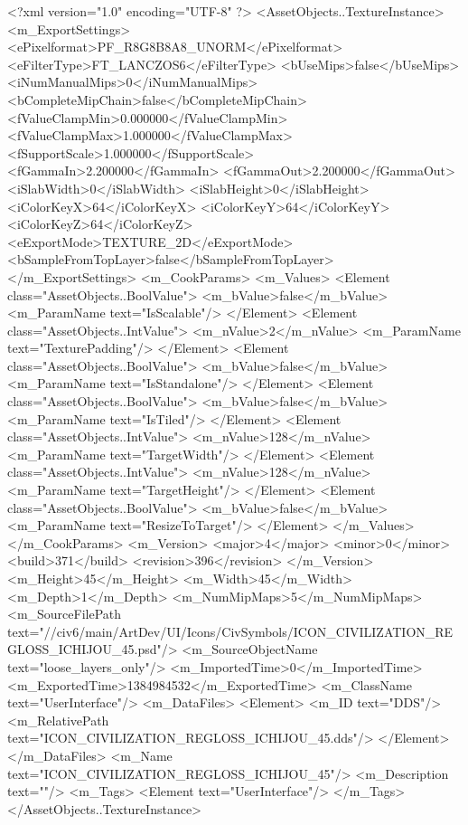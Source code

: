 <?xml version="1.0" encoding="UTF-8" ?>
<AssetObjects..TextureInstance>
	<m_ExportSettings>
		<ePixelformat>PF_R8G8B8A8_UNORM</ePixelformat>
		<eFilterType>FT_LANCZOS6</eFilterType>
		<bUseMips>false</bUseMips>
		<iNumManualMips>0</iNumManualMips>
		<bCompleteMipChain>false</bCompleteMipChain>
		<fValueClampMin>0.000000</fValueClampMin>
		<fValueClampMax>1.000000</fValueClampMax>
		<fSupportScale>1.000000</fSupportScale>
		<fGammaIn>2.200000</fGammaIn>
		<fGammaOut>2.200000</fGammaOut>
		<iSlabWidth>0</iSlabWidth>
		<iSlabHeight>0</iSlabHeight>
		<iColorKeyX>64</iColorKeyX>
		<iColorKeyY>64</iColorKeyY>
		<iColorKeyZ>64</iColorKeyZ>
		<eExportMode>TEXTURE_2D</eExportMode>
		<bSampleFromTopLayer>false</bSampleFromTopLayer>
	</m_ExportSettings>
	<m_CookParams>
		<m_Values>
			<Element class="AssetObjects..BoolValue">
				<m_bValue>false</m_bValue>
				<m_ParamName text="IsScalable"/>
			</Element>
			<Element class="AssetObjects..IntValue">
				<m_nValue>2</m_nValue>
				<m_ParamName text="TexturePadding"/>
			</Element>
			<Element class="AssetObjects..BoolValue">
				<m_bValue>false</m_bValue>
				<m_ParamName text="IsStandalone"/>
			</Element>
			<Element class="AssetObjects..BoolValue">
				<m_bValue>false</m_bValue>
				<m_ParamName text="IsTiled"/>
			</Element>
			<Element class="AssetObjects..IntValue">
				<m_nValue>128</m_nValue>
				<m_ParamName text="TargetWidth"/>
			</Element>
			<Element class="AssetObjects..IntValue">
				<m_nValue>128</m_nValue>
				<m_ParamName text="TargetHeight"/>
			</Element>
			<Element class="AssetObjects..BoolValue">
				<m_bValue>false</m_bValue>
				<m_ParamName text="ResizeToTarget"/>
			</Element>
		</m_Values>
	</m_CookParams>
	<m_Version>
		<major>4</major>
		<minor>0</minor>
		<build>371</build>
		<revision>396</revision>
	</m_Version>
	<m_Height>45</m_Height>
	<m_Width>45</m_Width>
	<m_Depth>1</m_Depth>
	<m_NumMipMaps>5</m_NumMipMaps>
	<m_SourceFilePath text="//civ6/main/ArtDev/UI/Icons/CivSymbols/ICON_CIVILIZATION_REGLOSS_ICHIJOU_45.psd"/>
	<m_SourceObjectName text="loose_layers_only"/>
	<m_ImportedTime>0</m_ImportedTime>
	<m_ExportedTime>1384984532</m_ExportedTime>
	<m_ClassName text="UserInterface"/>
	<m_DataFiles>
		<Element>
			<m_ID text="DDS"/>
			<m_RelativePath text="ICON_CIVILIZATION_REGLOSS_ICHIJOU_45.dds"/>
		</Element>
	</m_DataFiles>
	<m_Name text="ICON_CIVILIZATION_REGLOSS_ICHIJOU_45"/>
	<m_Description text=""/>
	<m_Tags>
		<Element text="UserInterface"/>
	</m_Tags>
</AssetObjects..TextureInstance>

